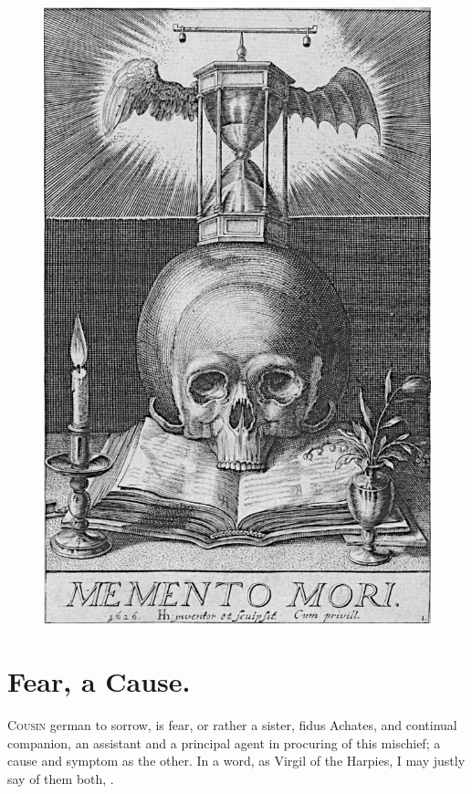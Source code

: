 {\cleartoleftpage{}
\begin{figure}[p]
  \begingroup
  \centering
  \includegraphics[keepaspectratio,width=\textwidth]{figures/memento-mori-small.jpg}
  \label{fig:mementomori}
\end{figure}

\clearpage{}
\thispagestyle{titleontop}
\section{Fear, a Cause.}

\lettrine{C}{ousin} german to sorrow, is fear, or rather a sister, fidus Achates,
and continual companion, an assistant and a principal agent in
procuring of this mischief; a cause and symptom as the other. In a
word, as Virgil of the Harpies, I may justly say of them both,
.

}
